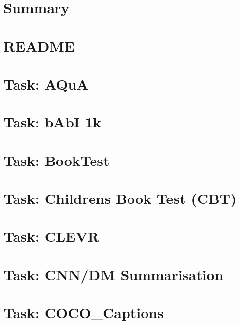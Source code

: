 \documentclass[twoside]{book}
\newcommand{\+}{\discretionary{\mbox{\scriptsize$\hookleftarrow$}}{}{}}
\begin{document}
\chapter{Summary}
\label{md_parlai_mturk_webapp_README}

\chapter{R\+E\+A\+D\+ME}
\label{md_parlai_README}

\chapter{Task\+: A\+QuA}
\label{md_parlai_tasks_aqua_README}

\chapter{Task\+: b\+AbI 1k}
\label{md_parlai_tasks_babi_README}

\chapter{Task\+: Book\+Test}
\label{md_parlai_tasks_booktest_README}

\chapter{Task\+: Children\textquotesingle{}s Book Test (C\+BT)}
\label{md_parlai_tasks_cbt_README}

\chapter{Task\+: C\+L\+E\+VR}
\label{md_parlai_tasks_clevr_README}

\chapter{Task\+: C\+N\+N/\+DM Summarisation}
\label{md_parlai_tasks_cnn_dm_README}

\chapter{Task\+: C\+O\+C\+O\+\_\+\+Captions}
\label{md_parlai_tasks_coco_caption_README}

\end{document}
